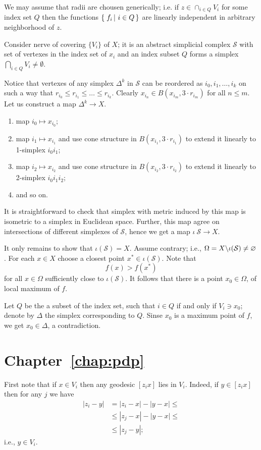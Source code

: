 We may assume that radii are chousen generically;
i.e. if $z\in\cap_{i\in Q}V_i$ for some index set $Q$ then the functions $\set{f_i}{i\in Q}$ are linearly independent in arbitrary neighborhood of $z$.

Consider nerve of covering $\{V_i\}$ of $X$;
it is an abstract simplicial complex $\mathcal S$
with set of vertexes in the index set of $x_i$ 
and an index subset $Q$ forms a simplex 
$\bigcap_{i\in Q}V_i\not=\emptyset$.

Notice that vertexes of any simplex $\Delta^k$ in $\mathcal S$ 
can be reordered as ${i_0},{i_1},\dots,{i_k}$ on such a way that $r_{i_0}\le r_{i_1}\le\dots\le r_{i_k}$.
Clearly $x_{i_n}\in B(x_{i_m},3\cdot r_{i_m})$ for all $n\le m$.
Let us construct a map $\Delta^k\to X$.
\begin{enumerate}
\item map $i_0\mapsto x_{i_0}$;
\item map $i_1\mapsto x_{i_1}$ and use cone structure in $B(x_{i_1},3\cdot r_{i_1})$ to extend it linearly to 1-simplex $i_0i_1$;
\item map $i_2\mapsto x_{i_2}$ and use cone structure in $B(x_{i_2},3\cdot r_{i_2})$ to extend it linearly to 2-simplex $i_0i_1i_2$;
\item and so on.
\end{enumerate}
It is straightforward to check that simplex with metric induced by this map is isometric to a simplex in Euclidean space.
Further, this map agree on intersections of different simplexes of $\mathcal S$, hence we get a map $\iota\:\mathcal S\to X$.

It only remains to show that $\iota(\mathcal S)=X$.
Assume contrary; 
i.e., $\Omega=X\backslash \iota(\mathcal S)\z\ne\emptyset$.
For each $x\in X$ choose a closest point $x^*\in \iota(\mathcal S)$.
Note that 
$$f(x)>f(x^*)$$
for all $x\in \Omega$ sufficiently close to $\iota(\mathcal S)$.
It follows that there is a point $x_0\in \Omega$,
of local maximum of $f$.

Let $Q$ be the a subset of the index set,
such that $i\in Q$ if and only if $V_i\ni x_0$;
denote by $\Delta$ the simplex corresponding to $Q$. 
Sinse $x_0$ is a maximum point of $f$,
we get $x_0\in \Delta$,
a contradiction.
\qeds

\section*{Chapter~\ref{chap:pdp}}

First note that if $x\in V_i$ then any geodesic $[z_ix]$ lies in $V_i$.
Indeed, if $y\in [z_ix]$ then for any $j$ we have
\begin{align*}
|z_i-y|
&=|z_i-x|-|y-x|\le
\\
&\le |z_j-x|-|y-x|\le
\\
&\le 
|z_j-y|;
\end{align*}
i.e., $y\in V_i$.

